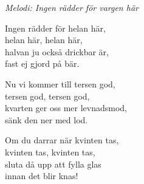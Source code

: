 {\footnotesize\textit{Melodi: Ingen rädder för vargen här}}\par
\vspace{10pt}
Ingen rädder för helan här,\\
helan här, helan här,\\
halvan ju också drickbar är,\\
fast ej gjord på bär.\par
\vspace{10pt}
Nu vi kommer till tersen god,\\
tersen god, tersen god,\\
kvarten ger oss mer levnadsmod,\\
sänk den ner med lod.\par
\vspace{10pt}
Om du darrar när kvinten tas,\\
kvinten tas, kvinten tas,\\
sluta då upp att fylla glas\\
innan det blir knas!
